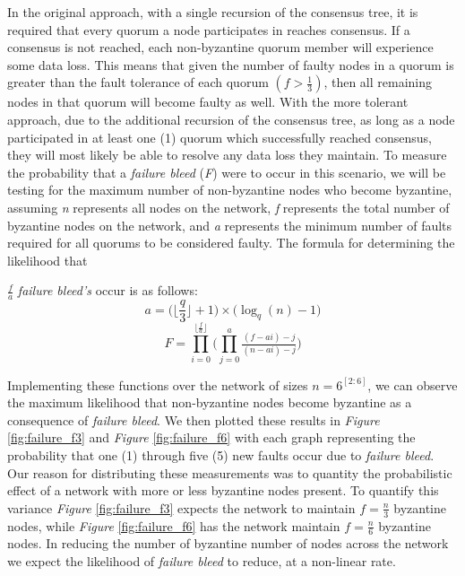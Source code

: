 In the original approach, with a single recursion of the consensus tree, it is required that every quorum a node participates in reaches consensus. If a consensus is not reached, each non-byzantine quorum member will experience some data loss. This means that given the number of faulty nodes in a quorum is greater than the fault tolerance of each quorum \((f > \frac{1}{3})\), then all remaining nodes in that quorum will become faulty as well. With the more tolerant approach, due to the additional recursion of the consensus tree, as long as a node participated in at least one (1) quorum which successfully reached consensus, they will most likely be able to resolve any data loss they maintain. To measure the probability that a \textit{failure bleed} (\textit{F}) were to occur in this scenario, we will be testing for the maximum number of non-byzantine nodes who become byzantine, assuming \textit{n} represents all nodes on the network, \textit{f} represents the total number of byzantine nodes on the network, and \textit{a} represents the minimum number of faults required for all quorums to be considered faulty. The formula for determining the likelihood that {\(\frac{f}{a}\) \textit{failure bleed’s} occur is as follows:
\[
a = \big (
\lfloor
\frac{q}{3}
\rfloor +1 \big )
\times
\big ( \log_q(n)-1 \big)
\]
\[
F =\prod ^{
\lfloor
\frac{f}{a}\rfloor
}
_{i=0} \bigg(
\prod _{j=0}^{a} \tfrac{(f-ai)-j}{(n-ai)-j} 
\bigg)
\]

Implementing these functions over the network of sizes \(n=6^{[2:6]}\), we can observe the maximum likelihood that non-byzantine nodes become byzantine as a consequence of \textit{failure bleed}. We then plotted these results in \textit{Figure} \ref{fig:failure_f3} and \textit{Figure} \ref{fig:failure_f6} with each graph representing the probability that one (1) through five (5) new faults occur due to \textit{failure bleed}. Our reason for distributing these measurements was to quantity the probabilistic effect of a network with more or less byzantine nodes present. To quantify this variance \textit{Figure} \ref{fig:failure_f3} expects the network to maintain \(f=\frac{n}{3}\) byzantine nodes, while \textit{Figure} \ref{fig:failure_f6} has the network maintain \(f=\frac{n}{6}\) byzantine nodes. In reducing the number of byzantine number of nodes across the network we expect the likelihood of \textit{failure bleed} to reduce, at a non-linear rate.



}
